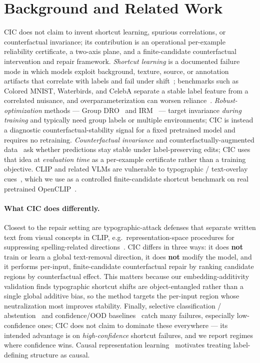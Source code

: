 \documentclass[11pt]{article}
\begin{document}
\section{Background and Related Work}\label{sec:related}
CIC does not claim to invent shortcut learning, spurious correlations, or
counterfactual invariance; its contribution is an operational per-example reliability
certificate, a two-axis plane, and a finite-candidate counterfactual intervention and
repair framework. \emph{Shortcut learning} is a documented failure mode in which
models exploit background, texture, source, or annotation artifacts that correlate
with labels and fail under shift~\cite{geirhos2020shortcut}; benchmarks such as
Colored MNIST, Waterbirds, and CelebA separate a stable label feature from a
correlated nuisance, and overparameterization can worsen
reliance~\cite{sagawa2020investigation}. \emph{Robust-optimization} methods --- Group
DRO~\cite{sagawa2020groupdro} and IRM~\cite{arjovsky2019irm} --- target invariance
\emph{during training} and typically need group labels or multiple environments;
CIC is instead a diagnostic counterfactual-stability signal for a fixed pretrained
model and requires no retraining. \emph{Counterfactual invariance} and
counterfactually-augmented data~\cite{kaushik2020counterfactual,veitch2021counterfactual}
ask whether predictions stay stable under label-preserving edits; CIC uses that idea
at \emph{evaluation time} as a per-example certificate rather than a training
objective. CLIP and related VLMs are vulnerable to typographic / text-overlay
cues~\cite{radford2021clip,goh2021multimodal}, which we use as a controlled
finite-candidate shortcut benchmark on real pretrained
OpenCLIP~\cite{ilharco2021openclip,schuhmann2022laion5b}.

\paragraph{What CIC does differently.}
Closest to the repair setting are typographic-attack defenses that separate written
text from visual concepts in CLIP, e.g.\ representation-space procedures for
suppressing spelling-related directions~\cite{materzynska2022disentangling}. CIC
differs in three ways: it does \textbf{not} train or learn a global text-removal
direction, it does \textbf{not} modify the model, and it performs per-input,
finite-candidate counterfactual repair by ranking candidate regions by counterfactual
effect. This matters because our embedding-additivity validation finds typographic
shortcut shifts are object-entangled rather than a single global additive bias, so the
method targets the per-input region whose neutralization most improves stability.
Finally, selective classification / abstention~\cite{geifman2017selective} and
confidence/OOD baselines~\cite{hendrycks2017baseline} catch many failures, especially
low-confidence ones; CIC does not claim to dominate these everywhere --- its intended
advantage is on \emph{high-confidence} shortcut failures, and we report regimes where
confidence wins. Causal representation learning~\cite{scholkopf2021causal} motivates
treating label-defining structure as causal.
\end{document}

